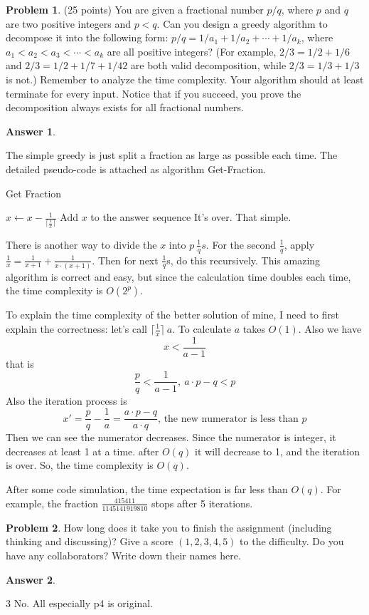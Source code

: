 \documentclass{article}
\theoremstyle{definition}
\newtheorem{prob}{Problem}
\newtheorem{ans}{Answer}
\begin{document}
	\begin{prob}
		(25 points) You are given a fractional number $p / q$, where $p$ and $q$ are two positive integers and $p<q$. Can you design a greedy algorithm to decompose it into the following form: $p / q=1 / a_{1}+1 / a_{2}+\cdots+1 / a_{k}$, where $a_{1}<a_{2}<a_{3}<\cdots<a_{k}$ are all positive integers? (For example, $2 / 3=1 / 2+1 / 6$ and $2 / 3=1 / 2+1 / 7+1 / 42$ are both valid decomposition, while $2 / 3=1 / 3+1 / 3$ is not.) Remember to analyze the time complexity. Your algorithm should at least terminate for every input. Notice that if you succeed, you prove the decomposition always exists for all fractional numbers.
	\end{prob}
	
	\begin{ans}
		~
		
		The simple greedy is just split a fraction as large as possible each time. The detailed pseudo-code is attached as algorithm Get-Fraction.
		
		\begin{algorithm}
			\caption{Get Fraction}
			\BlankLine
			{
				$x\gets x-\frac{1}{\lceil\frac{1}{x}\rceil}$\;
				Add $x$ to the answer sequence\;
			}
			It's over. That simple.
		\end{algorithm}
	
		There is another way to divide the $x$ into $p~\frac{1}{q}s$. For the second $\frac{1}{q}$, apply $\frac{1}{x}=\frac{1}{x+1}+\frac{1}{x\cdot(x+1)}$. Then for next $\frac{1}{q}$s, do this recursively. This amazing algorithm is correct and easy, but since the calculation time doubles each time, the time complexity is $O(2^p)$.
		
		To explain the time complexity of the better solution of mine, I need to first explain the correctness: let's call $\lceil\frac{1}{x}\rceil~a$. To calculate $a$ takes $O(1)$. Also we have $$x<\frac{1}{a-1}$$that is $$\frac{p}{q}<\frac{1}{a-1},~a\cdot p - q < p$$ Also the iteration process is $$x'=\frac{p}{q}-\frac{1}{a}=\frac{a\cdot p - q}{a\cdot q}\text{, the new numerator is less than }p$$ Then we can see the numerator decreases. Since the numerator is integer, it decreases at least 1 at a time. after $O(q)$ it will decrease to 1, and the iteration is over. So, the time complexity is $O(q)$.
		
		After some code simulation, the time expectation is far less than $O(q)$. For example, the fraction $\frac{415411}{1145141919810}$ stops after 5 iterations.
		
	\end{ans}
	
	\begin{prob}
		How long does it take you to finish the assignment (including thinking and discussing)? Give a score $(1,2,3,4,5)$ to the difficulty. Do you have any collaborators? Write down their names here.
	\end{prob}
	\begin{ans}
		~
		
		3 No. All especially p4 is original. 
	\end{ans}
\end{document}
